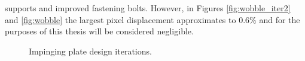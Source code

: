 supports and improved fastening bolts. However, in Figures \ref{fig:wobble_iter2} and \ref{fig:wobble} the largest pixel displacement approximates to $0.6\%$ and for the purposes of this thesis will be considered negligible.

\begin{figure}[H]
  \centering
  \hfill
  \caption{Impinging plate design iterations.}
  \label{fig:plate_iter}
\end{figure}

